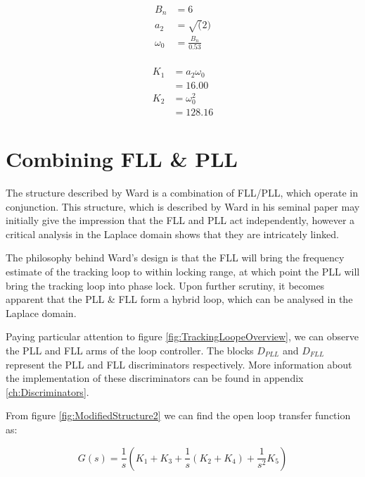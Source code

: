 \begin{align*}
B_n &= 6\\
a_2 &= \sqrt(2)\\
\omega_{0}&=\frac{B_n}{0.53}\\
\end{align*}

\begin{align*}
K_1 & = a_2 \omega_{0}\\
    & = 16.00\\
K_2 & = \omega_{0}^2\\
    & = 128.16
\end{align*}

\clearpage

\section{Combining FLL \& PLL}

The structure described by Ward is a combination of FLL/PLL, which operate in conjunction. This structure, which is described by Ward in his seminal paper  may initially give the impression that the FLL and PLL act independently, however a critical analysis in the Laplace domain shows that they are intricately linked\cite{Ward}.

The philosophy behind Ward's design is that the FLL will bring the frequency estimate of the tracking loop to within locking range, at which point the PLL will bring the tracking loop into phase lock. Upon further scrutiny, it becomes apparent that the PLL \& FLL form a hybrid loop, which can be analysed in the Laplace domain.


Paying particular attention to figure \ref{fig:TrackingLoopeOverview}, we can observe the PLL and FLL arms of the loop controller. The blocks $D_{PLL}$ and $D_{FLL}$ represent the PLL and FLL discriminators respectively. More information about the implementation of these discriminators can be found in appendix \ref{ch:Discriminators}. 







From figure \ref{fig:ModifiedStructure2} we can find the open loop transfer function as:

\begin{equation}
G(s) = \frac{1}{s} (K_1+K_3 + \frac{1}{s}(K_2+K_4) + \frac{1}{s^2} K_5)
\label{eq:CombinedOpenLoopTF}
\end{equation}


